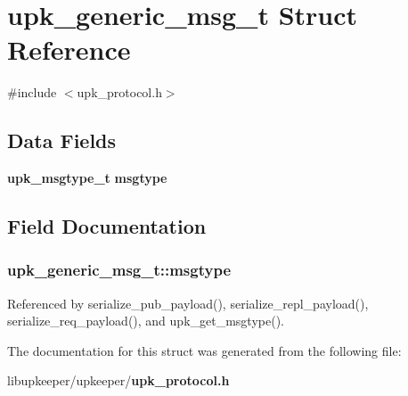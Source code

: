 \section{upk\_\-generic\_\-msg\_\-t Struct Reference}
\label{structupk__generic__msg__t}


{\ttfamily \#include $<$upk\_\-protocol.h$>$}

\subsection*{Data Fields}
\begin{DoxyCompactItemize}
\item 
{\bf upk\_\-msgtype\_\-t} {\bf msgtype}
\end{DoxyCompactItemize}


\subsection{Field Documentation}
\subsubsection[{msgtype}]{ {\bf upk\_\-generic\_\-msg\_\-t::msgtype}}\label{structupk__generic__msg__t_af8898deba9f752f9f6b0281800a4b9c1}


Referenced by serialize\_\-pub\_\-payload(), serialize\_\-repl\_\-payload(), serialize\_\-req\_\-payload(), and upk\_\-get\_\-msgtype().



The documentation for this struct was generated from the following file:\begin{DoxyCompactItemize}
\item 
libupkeeper/upkeeper/{\bf upk\_\-protocol.h}\end{DoxyCompactItemize}

